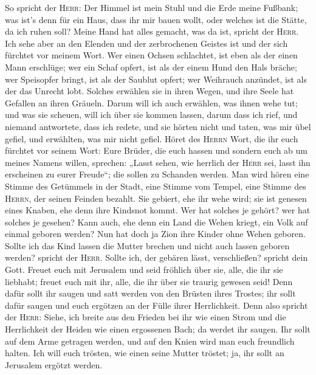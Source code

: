  So spricht der \textsc{Herr}: Der Himmel ist mein Stuhl
und die Erde meine Fußbank; was ist's denn für ein Haus, dass ihr mir
bauen wollt, oder welches ist die Stätte, da ich ruhen soll?
 Meine Hand hat alles gemacht, was da ist, spricht der
\textsc{Herr}. Ich sehe aber an den Elenden und der zerbrochenen Geistes
ist und der sich fürchtet vor meinem Wort.  Wer einen
Ochsen schlachtet, ist eben als der einen Mann erschlüge; wer ein Schaf
opfert, ist als der einem Hund den Hals bräche; wer Speisopfer bringt,
ist als der Saublut opfert; wer Weihrauch anzündet, ist als der das
Unrecht lobt. Solches erwählen sie in ihren Wegen, und ihre Seele hat
Gefallen an ihren Gräueln.  Darum will ich auch erwählen,
was ihnen wehe tut; und was sie scheuen, will ich über sie kommen
lassen, darum dass ich rief, und niemand antwortete, dass ich redete,
und sie hörten nicht und taten, was mir übel gefiel, und erwählten, was
mir nicht gefiel.  Höret des \textsc{Herrn} Wort, die ihr
euch fürchtet vor seinem Wort: Eure Brüder, die euch hassen und sondern
euch ab um meines Namens willen, sprechen: „Lasst sehen, wie herrlich
der \textsc{Herr} sei, lasst ihn erscheinen zu eurer Freude``; die
sollen zu Schanden werden.  Man wird hören eine Stimme des
Getümmels in der Stadt, eine Stimme vom Tempel, eine Stimme des
\textsc{Herrn}, der seinen Feinden bezahlt.  Sie gebiert,
ehe ihr wehe wird; sie ist genesen eines Knaben, ehe denn ihre Kindsnot
kommt.  Wer hat solches je gehört? wer hat solches je
gesehen? Kann auch, ehe denn ein Land die Wehen kriegt, ein Volk auf
einmal geboren werden? Nun hat doch ja Zion ihre Kinder ohne Wehen
geboren.  Sollte ich das Kind lassen die Mutter brechen
und nicht auch lassen geboren werden? spricht der \textsc{Herr}. Sollte
ich, der gebären lässt, verschließen? spricht dein Gott. 
Freuet euch mit Jerusalem und seid fröhlich über sie, alle, die ihr sie
liebhabt; freuet euch mit ihr, alle, die ihr über sie traurig gewesen
seid!  Denn dafür sollt ihr saugen und satt werden von
den Brüsten ihres Trostes; ihr sollt dafür saugen und euch ergötzen an
der Fülle ihrer Herrlichkeit.  Denn also spricht der
\textsc{Herr}: Siehe, ich breite aus den Frieden bei ihr wie einen Strom
und die Herrlichkeit der Heiden wie einen ergossenen Bach; da werdet ihr
saugen. Ihr sollt auf dem Arme getragen werden, und auf den Knien wird
man euch freundlich halten.  Ich will euch trösten, wie
einen seine Mutter tröstet; ja, ihr sollt an Jerusalem ergötzt werden.
